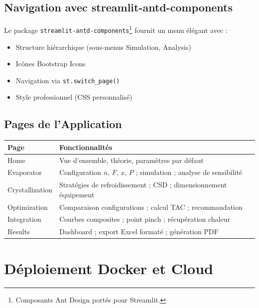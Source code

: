 \documentclass[12pt,a4paper,twoside]{article}
\begin{document}
\subsection{Navigation avec streamlit-antd-components}

Le package \texttt{streamlit-antd-components}\footnote{Composants Ant Design portés pour Streamlit.} fournit un menu élégant avec :

\begin{itemize}[noitemsep]
    \item Structure hiérarchique (sous-menus Simulation, Analysis)
    \item Icônes Bootstrap Icons
    \item Navigation via \texttt{st.switch\_page()}
    \item Style professionnel (CSS personnalisé)
\end{itemize}

\subsection{Pages de l'Application}

\begin{table}[htbp]
\centering
\small
\begin{tabular}{lp{7cm}}
\toprule
\textbf{Page} & \textbf{Fonctionnalités} \\
\midrule
Home & Vue d'ensemble, théorie, paramètres par défaut \\
Evaporator & Configuration $n$, $F$, $x$, $P$ ; simulation ; analyse de sensibilité \\
Crystallization & Stratégies de refroidissement ; CSD ; dimensionnement équipement \\
Optimization & Comparaison configurations ; calcul TAC ; recommandation \\
Integration & Courbes composites ; point pinch ; récupération chaleur \\
Results & Dashboard ; export Excel formaté ; génération PDF \\
\bottomrule
\end{tabular}
\end{table}

\section{Déploiement Docker et Cloud}
\end{document}
